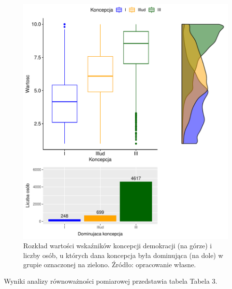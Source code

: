 \documentclass[12pt]{article}
\begin{document}
\begin{figure}

{\centering \includegraphics{text_ASA_files/figure-latex/stats-gr-1-1} 

}

\caption{Rozkład wartości wskaźników koncepcji demokracji (na górze) i liczby osób, u których dana koncepcja była dominująca (na dole) w grupie oznaczonej na zielono. Źródło: opracowanie własne.}\label{fig:stats-gr-1}
\end{figure}

Wyniki analizy równoważności pomiarowej przedstawia tabela Tabela 3.

\begin{table}

\caption{\label{tab:tab-gr-1}Wyniki analizy równoważności pomiarowej dla grupy oznaczonej na zielono. Źródło: opracowanie własne.}
\centering
{}
\end{table}
\end{document}

